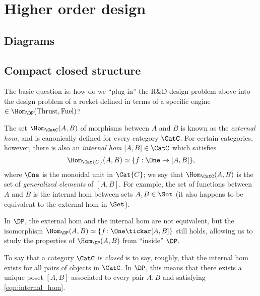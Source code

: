 \section{Higher order design}
\subsection{Diagrams}
\subsection{Compact closed structure}\label{sec:compact_closed}
The basic question is: how do we ``plug in'' the R\&D design problem above into the design problem of a rocket defined in terms of a specific engine $\in \Hom_\DP(\text{Thrust}, \text{Fuel})$? %

The set $\Hom_\CatC(A,B)$ of morphisms between $A$ and $B$ is known as the \emph{external hom}, and is canonically defined for every category $\CatC$. For certain categories, however, there is also an \emph{internal hom} $[A,B] \in \CatC$ which satisfies
\begin{equation}\label{eqn:internal_hom}
\Hom_\Cat{C}(A,B) \simeq \{ f : \One \to [A,B] \},
\end{equation}
where $\One$ is the monoidal unit in $\Cat{C}$; we say that $\Hom_\CatC(A,B)$ is the set of \emph{generalized elements} of $[A,B]$. For example, the set of functions between $A$ and $B$ is the internal hom between sets $A,B \in \Set$ (it also happens to be equivalent to the external hom in $\Set$).


In $\DP$, the external hom and the internal hom are not equivalent, but the isomorphism $\Hom_\DP(A,B) \simeq \{ f \colon \One \tickar [A,B] \}$ still holds, allowing us to study the properties of $\Hom_\DP(A,B)$ from ``inside'' $\DP$.


To say that a category $\CatC$ is \emph{closed} is to say, roughly, that the internal hom exists for all pairs of objects in $\CatC$. In $\DP$, this means that there exists a unique poset $[A,B]$ associated to every pair $A,B$ and satisfying \cref{eqn:internal_hom}. %

